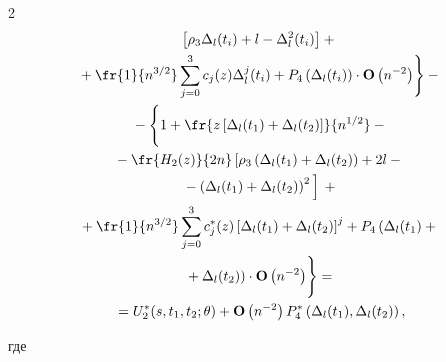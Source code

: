 \begin{multicols}{2}
\begin{multline*}
    \left[ \rho_3


    \Delta_l(t_i)+l-\Delta_l^2(t_i)\right]+


{}\\


   {}  +\fr{1}{n^{3/2}} \sum_{j=0}^3 c_j(z) \Delta_l^j(t_i)+


      P_4\left(\Delta_l(t_i)\right)\cdot {\bf O}\left(n^{-2}\right)


    \Biggr\}-{}\\


    {}-


     \Biggl\{ 1+


    \fr{z\left[\Delta_l(t_1)+\Delta_l(t_2) \right]}{n^{1/2}}-


{}\\


    {} -\fr{H_2(z)}{2n}


       \left[ \vphantom{\fr{H_2(z)}{2n}}


        \rho_3 \left(


       \Delta_l(t_1)+\Delta_l(t_2) \right)+2l-{}\right.\\


\left.       {}-


       \left(\Delta_l(t_1)+\Delta_l(t_2) \right)^2 


       \vphantom{\fr{H_2(z)}{2n}}


       \right] \vphantom{\fr{H_2(z)}{2n}}+


    {}\\


    {} +\fr{1}{n^{3/2}} \sum_{j=0}^3 c_j^*(z)


       \left[\Delta_l(t_1)+\Delta_l(t_2) \right]^j+


       P_4\left(\Delta_l(t_1)+ {}\right.\\


\left.       {}+


\Delta_l(t_2)\right)\cdot


       {\bf O}\left(n^{-2}\right) \Biggr\}=


    {}\\


{} =U_2^*(s,t_1,t_2;\theta)+{\bf O}\left(n^{-2}\right)


       P_4^* \left(\Delta_l(t_1),\Delta_l(t_2)\right),


    \end{multline*}


    где


\begin{multline*}  



\end{multline*}
\end{multicols}
